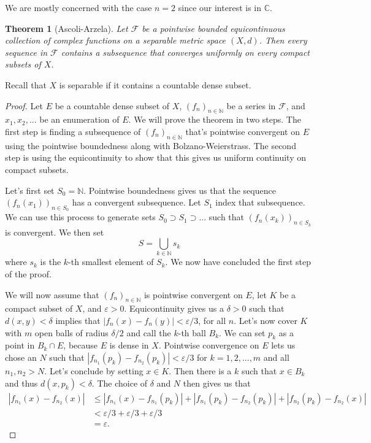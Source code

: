 \documentclass[a4paper,12pt,twoside,BCOR=10mm]{scrbook}
\newtheorem{theorem}{Theorem}[section]
\theoremstyle{definition}
\theoremstyle{definition}
\theoremstyle{definition}
\begin{document}
We are mostly concerned with the case $n = 2$ since our interest is in $\mathbb{C}$.
\begin{theorem}[Ascoli-Arzela]
Let $\mathcal{F}$ be a pointwise bounded equicontinuous collection of complex functions on a separable metric space $(X, d)$.
Then every sequence in $\mathcal{F}$ contains a subsequence that converges uniformly on every compact subsets of $X$.
\end{theorem}
\label{index23}
Recall that $X$ is separable if it contains a countable dense subset.
\begin{proof}
Let $E$ be a countable dense subset of $X$,
	$(f_n)_{n \in \mathbb{N}}$ be a series in $\mathcal{F}$,
	and $x_1, x_2, ...$ be an enumeration of $E$.
We will prove the theorem in two steps.
The first step is finding a subsequence of $(f_n)_{n \in \mathbb{N}}$ that's pointwise convergent on $E$ using the pointwise boundedness along with Bolzano-Weierstrass.
The second step is using the equicontinuity to show that this gives us uniform continuity on compact subsets.

Let's first set $S_0 = \mathbb{N}$.
Pointwise boundedness gives us that the sequence $(f_n(x_1))_{n \in S_0}$ has a convergent subsequence.
Let $S_1$ index that subsequence.
We can use this process to generate sets $S_0 \supset S_1 \supset ...$ such that $(f_n(x_k))_{n \in S_k}$ is convergent.
We then set
\[
	S = \bigcup_{k \in \mathbb{N}} s_k
\]
where $s_k$ is the $k$-th smallest element of $S_k$.
We now have concluded the first step of the proof.

We will now assume that $(f_n)_{n \in \mathbb{N}}$ is pointwise convergent on $E$,
	let $K$ be a compact subset of $X$, and
	$\varepsilon > 0$.
Equicontinuity gives us a $\delta > 0$ such that $d(x, y) < \delta$ implies that $|f_n(x) - f_n(y)| < \varepsilon /3$, for all $n$.
Let's now cover $K$ with $m$ open balls of radius $\delta /2$ and call the $k$-th ball $B_k$.
We can set $p_k$ as a point in $B_k \cap E$, because $E$ is dense in $X$.
Pointwise convergence on $E$ lets us chose an $N$ such that $|f_{n_1}(p_k) - f_{n_2}(p_k)| < \varepsilon /3$ for $k = 1, 2, ..., m$ and all $n_1, n_2 > N$.
Let's conclude by setting $x \in K$.
Then there is a $k$ such that $x \in B_k$ and thus $d(x, p_k) < \delta$.
The choice of $\delta$ and $N$ then gives us that
\begin{align*}
	|f_{n_1}(x) - f_{n_2}(x)|
	& \leq |f_{n_1}(x) - f_{n_1}(p_k)| + |f_{n_1}(p_k) - f_{n_2}(p_k)| + |f_{n_2}(p_k) - f_{n_2}(x)|\\
	& < \varepsilon /3 + \varepsilon /3 + \varepsilon /3 \\
	& = \varepsilon.
\end{align*}
\end{proof}
\end{document}
